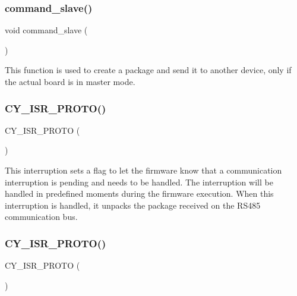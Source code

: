 \subsubsection{command\+\_\+slave()}
{\footnotesize\ttfamily void command\+\_\+slave (\begin{DoxyParamCaption}{ }\end{DoxyParamCaption})}

This function is used to create a package and send it to another device, only if the actual board is in master mode. \mbox{\label{interruptions_8h_a7e24af8c83537b0441877bf0f00dd30a}} 
\subsubsection{C\+Y\+\_\+\+I\+S\+R\+\_\+\+P\+R\+O\+T\+O()\hspace{0.1cm}{\footnotesize\ttfamily [1/2]}}
{\footnotesize\ttfamily C\+Y\+\_\+\+I\+S\+R\+\_\+\+P\+R\+O\+TO (\begin{DoxyParamCaption}\item[{I\+S\+R\+\_\+\+R\+S485\+\_\+\+R\+X\+\_\+\+Ex\+Interrupt}]{ }\end{DoxyParamCaption})}

This interruption sets a flag to let the firmware know that a communication interruption is pending and needs to be handled. The interruption will be handled in predefined moments during the firmware execution. When this interruption is handled, it unpacks the package received on the R\+S485 communication bus. \mbox{\label{interruptions_8h_a212cae8995d67d612c236fb54a4d29dc}} 
\subsubsection{C\+Y\+\_\+\+I\+S\+R\+\_\+\+P\+R\+O\+T\+O()\hspace{0.1cm}{\footnotesize\ttfamily [2/2]}}
{\footnotesize\ttfamily C\+Y\+\_\+\+I\+S\+R\+\_\+\+P\+R\+O\+TO (\begin{DoxyParamCaption}\item[{I\+S\+R\+\_\+\+W\+A\+T\+C\+H\+D\+O\+G\+\_\+\+Handler}]{ }\end{DoxyParamCaption})}

